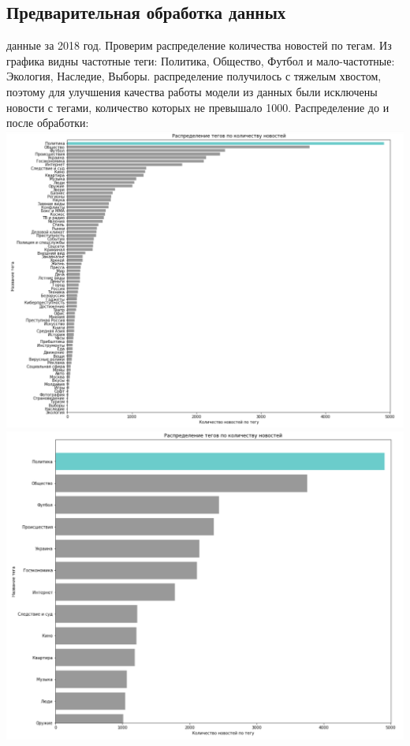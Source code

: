 \documentclass{article}
\newcommand\tab[1][1cm]{\hspace*{#1}}
\begin{document}
\subsection{Предварительная обработка данных}
 данные за 2018 год. Проверим распределение количества новостей по тегам. Из графика видны частотные теги: Политика, Общество, Футбол и мало-частотные: Экология, Наследие, Выборы. распределение получилось с тяжелым хвостом, поэтому для улучшения качества работы модели из данных были исключены новости с тегами, количество которых не превышало 1000. Распределение до и после обработки:\\
\includegraphics[scale=0.6]{f7.png}\\
\includegraphics[scale=0.6]{f12.png}\\
\end{document}
